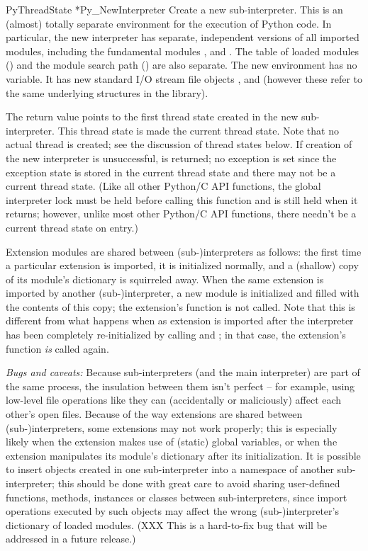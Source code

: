 \documentclass[twoside,openright]{report}
\begin{document}
\begin{cfuncdesc}{PyThreadState *}{Py_NewInterpreter}{}
Create a new sub-interpreter.  This is an (almost) totally separate 
environment for the execution of Python code.  In particular, the new 
interpreter has separate, independent versions of all imported 
modules, including the fundamental modules , 
 and .  The table of loaded modules 
() and the module search path () are 
also separate.  The new environment has no  variable.  
It has new standard I/O stream file objects , 
 and  (however these refer to the 
same underlying  structures in the \C{} library).

The return value points to the first thread state created in the new 
sub-interpreter.  This thread state is made the current thread state.  
Note that no actual thread is created; see the discussion of thread 
states below.  If creation of the new interpreter is unsuccessful, 
\NULL{} is returned; no exception is set since the exception state 
is stored in the current thread state and there may not be a current 
thread state.  (Like all other Python/C API functions, the global 
interpreter lock must be held before calling this function and is 
still held when it returns; however, unlike most other Python/C API 
functions, there needn't be a current thread state on entry.)

Extension modules are shared between (sub-)interpreters as follows: 
the first time a particular extension is imported, it is initialized 
normally, and a (shallow) copy of its module's dictionary is 
squirreled away.  When the same extension is imported by another 
(sub-)interpreter, a new module is initialized and filled with the 
contents of this copy; the extension's  function is not 
called.  Note that this is different from what happens when as 
extension is imported after the interpreter has been completely 
re-initialized by calling  and 
; in that case, the extension's  
function \emph{is} called again.

\emph{Bugs and caveats:} Because sub-interpreters (and the main 
interpreter) are part of the same process, the insulation between them 
isn't perfect -- for example, using low-level file operations like 
 they can (accidentally or maliciously) affect each 
other's open files.  Because of the way extensions are shared between 
(sub-)interpreters, some extensions may not work properly; this is 
especially likely when the extension makes use of (static) global 
variables, or when the extension manipulates its module's dictionary 
after its initialization.  It is possible to insert objects created in 
one sub-interpreter into a namespace of another sub-interpreter; this 
should be done with great care to avoid sharing user-defined 
functions, methods, instances or classes between sub-interpreters, 
since import operations executed by such objects may affect the 
wrong (sub-)interpreter's dictionary of loaded modules.  (XXX This is 
a hard-to-fix bug that will be addressed in a future release.)
\end{cfuncdesc}
\end{document}
